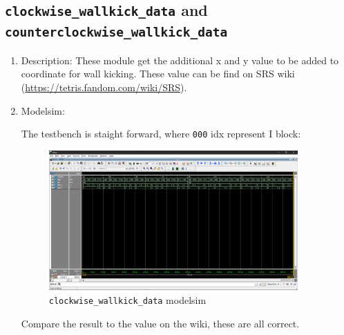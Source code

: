 \documentclass[scale = 0.9]{article}
\newcommand{\code}[1]{\colorbox{light-gray}{\texttt{#1}}} %
\begin{document}
\subsection{\code{clockwise\_wallkick\_data} and \code{counterclockwise\_wallkick\_data}}
\begin{enumerate}[label=(\alph*)]
  \item Description:
        These module get the additional x and y value to be added to coordinate for wall kicking.
        These value can be find on SRS wiki (\url{https://tetris.fandom.com/wiki/SRS}).
  \item Modelsim:

        The testbench is staight forward, where \code{000} idx represent I block:
        \begin{figure}[H]
          \begin{center}
            \includegraphics[width=0.9\textwidth]{clockwise_wallkick_data.png}
            \caption{\code{clockwise\_wallkick\_data} modelsim}\label{clockwise_wallkick_data}
          \end{center}
        \end{figure}

        Compare the result to the value on the wiki, these are all correct.

\end{enumerate}
\end{document}
